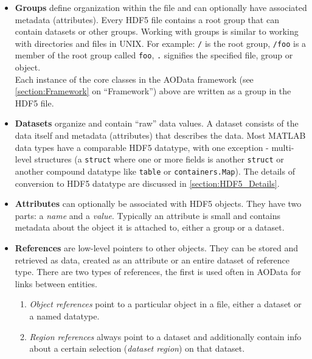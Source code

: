 \documentclass[10pt]{exam}
\newcommand\myurl[1]{\textcolor{blue}{\underline{#1}}}
\newcommand\aodclass[1]{\textcolor{codeblue}{\texttt{#1}}}
\begin{document}
			\begin{itemize}
				\item \textbf{Groups} define organization within the file and can optionally have associated metadata (attributes). Every HDF5 file contains a root group that can contain datasets or other groups. Working with groups is similar to working with directories and files in UNIX. For example: \texttt{/} is the root group, \texttt{/foo} is a member of the root group called \texttt{foo}, \texttt{.} signifies the specified file, group or object.\\
			Each instance of the core classes in the AOData framework (see \myurl{\ref{section:Framework}} on ``Framework'') above are written as a group in the HDF5 file. 
				\item \textbf{Datasets} organize and contain ``raw'' data values. A dataset consists of the data itself and metadata (attributes) that describes the data. Most MATLAB data types have a comparable HDF5 datatype, with one exception - multi-level structures (a \aodclass{struct} where one or more fields is another \aodclass{struct} or another compound datatype like \aodclass{table} or \aodclass{containers.Map}). The details of conversion to HDF5 datatype are discussed in \ref{section:HDF5_Details}. 
				\item \textbf{Attributes} can optionally be associated with HDF5 objects. They have two parts: a \textit{name} and a \textit{value}. Typically an attribute is small and contains metadata about the object it is attached to, either a group or a dataset. 
				\item \textbf{References} are low-level pointers to other objects. They can be stored and retrieved as data, created as an attribute or an entire dataset of reference type. 
				There are two types of references, the first is used often in AOData for links between entities.
				\begin{enumerate}
					\item \textit{Object references} point to a particular object in a file, either a dataset or a named datatype. 
					\item \textit{Region references} always point to a dataset and additionally contain info about a certain selection (\textit{dataset region}) on that dataset. %
				\end{enumerate}
			\end{itemize}
\end{document}
